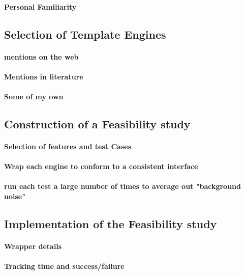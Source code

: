 \paragraph{Personal Familiarity}

\subsection{Selection of Template Engines}
\paragraph{mentions on the web}
\paragraph{Mentions in literature}
\paragraph{Some of my own}

\subsection{Construction of a Feasibility study}
\paragraph{Selection of features and test Cases}
\paragraph{Wrap each engine to conform to a consistent interface}
\paragraph{run each test a large number of times to average out "background noise"}

\subsection{Implementation of the Feasibility study}
\paragraph{Wrapper details}
\paragraph{Tracking time and success/failure}

